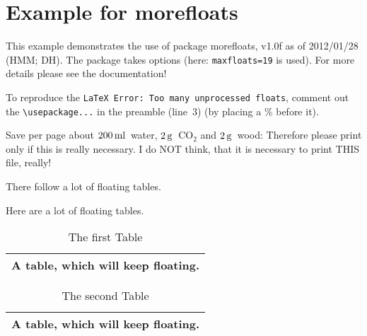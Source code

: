 \documentclass[british]{article}[2007/10/19]%
\gdef\unit#1{\mathord{\thinspace\mathrm{#1}}}%
\begin{document}
\section*{Example for morefloats}

This example demonstrates the use of package\newline
\textsf{morefloats}, v1.0f as of 2012/01/28 (HMM; DH).\newline
The package takes options (here: \verb|maxfloats=19| is used).\newline
For more details please see the documentation!\newline

To reproduce the\newline
\texttt{\LaTeX{} Error: Too many unprocessed floats},\newline
comment out the \verb|\usepackage...| in the preamble
(line~3)\newline
(by placing a \% before it).\newline

\bigskip

Save per page about $200\unit{ml}$~water, $2\unit{g}$~CO$_{2}$
and $2\unit{g}$~wood:\newline
Therefore please print only if this is really necessary.\newline
I do NOT think, that it is necessary to print THIS file, really!

\bigskip

There follow a lot of floating tables.

\pagebreak

Here are a lot of floating tables.\newline

\begin{table}[t] \centering%
\begin{tabular}{|l|}
\hline
A table, which will keep floating.\\ \hline
\end{tabular}%
\caption{The first Table}%
\end{table}%

\begin{table}[t] \centering%
\begin{tabular}{|l|}
\hline
A table, which will keep floating.\\ \hline
\end{tabular}%
\caption{The second Table}%
\end{table}%
\end{document}
